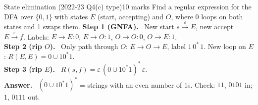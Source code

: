 \documentclass[10.5pt,a4paper]{article}
\newcommand{\ansh}[1]{\textbf{\color{exborder}#1}\ }
\newcommand{\eps}{\varepsilon}
\begin{document}
\begin{examq}{State elimination (2022-23 Q4(c) type)}{10 marks}
Find a regular expression for the DFA over $\{0,1\}$ with states $E$ (start, accepting) and $O$, where 0 loops on both states and 1 swaps them.
\tcblower
\ansh{Step 1 (GNFA).} New start $s\xrightarrow{\eps}E$, new accept $E\xrightarrow{\eps}f$. Labels: $E\to E:0$, $E\to O:1$, $O\to O:0$, $O\to E:1$.\\
\ansh{Step 2 (rip $O$).} Only path through $O$: $E\to O\to E$, label $1\,0^*\,1$. New loop on $E$: $R(E,E)=0\cup10^*1$.\\
\ansh{Step 3 (rip $E$).} $R(s,f)=\eps\,(0\cup10^*1)^*\,\eps$.\\
\ansh{Answer.} $(0\cup10^*1)^*$ = strings with an even number of 1s. Check: $11$, $0101$ in; $1$, $0111$ out.
\end{examq}
\end{document}
